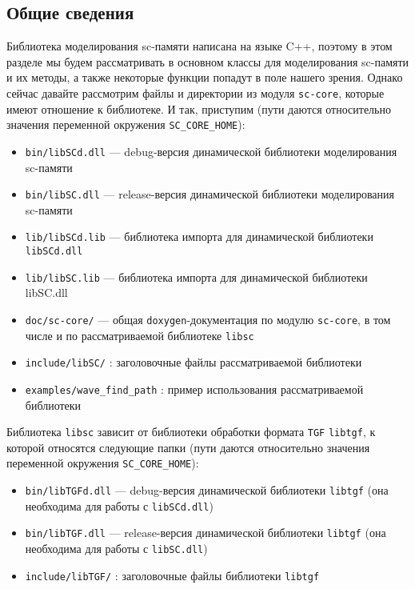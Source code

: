 \subsection{Общие сведения}
\label{sec:libsc_general_info}

Библиотека моделирования sc-памяти написана на языке C++, поэтому в
этом разделе мы будем рассматривать в основном классы для
моделирования sc-памяти и их методы, а также некоторые функции попадут
в поле нашего зрения. Однако сейчас давайте рассмотрим файлы и
директории из модуля \texttt{sc-core}, которые имеют отношение к
библиотеке. И так, приступим (пути даются относительно значения
переменной окружения \verb|SC_CORE_HOME|):

\begin{itemize}
\item \verb|bin/libSCd.dll| --- debug-версия динамической библиотеки
  моделирования sc-памяти
\item \verb|bin/libSC.dll| --- release-версия динамической библиотеки
  моделирования sc-памяти
\item \verb|lib/libSCd.lib| --- библиотека импорта для динамической библиотеки
  \texttt{libSCd.dll}
\item \verb|lib/libSC.lib| --- библиотека импорта для динамической библиотеки
  libSC.dll
\item \verb|doc/sc-core/| --- общая \texttt{doxygen}-документация по
  модулю \texttt{sc-core}, в том числе и по рассматриваемой библиотеке
  \texttt{libsc}
\item \verb|include/libSC/| : заголовочные файлы рассматриваемой
  библиотеки
\item \verb|examples/wave_find_path| : пример использования
  рассматриваемой библиотеки
\end{itemize}

Библиотека \texttt{libsc} зависит от библиотеки обработки формата
\texttt{TGF} \texttt{libtgf}, к которой относятся следующие папки
(пути даются относительно значения переменной окружения
\verb|SC_CORE_HOME|):

\begin{itemize}
\item \verb|bin/libTGFd.dll| --- debug-версия динамической библиотеки
  \texttt{libtgf} (она необходима для работы с \texttt{libSCd.dll})
\item \verb|bin/libTGF.dll| --- release-версия динамической библиотеки
  \texttt{libtgf} (она необходима для работы с \texttt{libSC.dll})
\item \verb|include/libTGF/| : заголовочные файлы библиотеки
  \texttt{libtgf}
\end{itemize}


